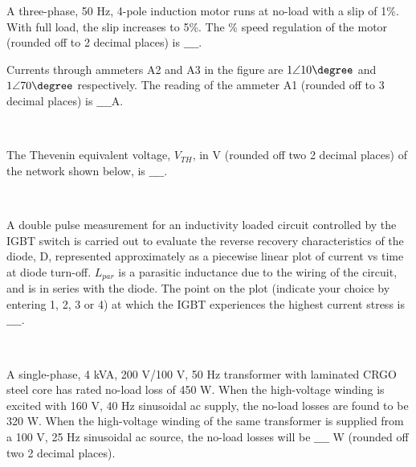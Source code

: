 \iffalse
\chapter{2020}
\author{AI24BTECH11009}
\section{ee}
\fi

\item A three-phase, 50 Hz, 4-pole induction motor runs at no-load with a slip of 1\%. With full load, the slip increases to 5\%. The \% speed regulation of the motor (rounded off to 2 decimal places) is $\_\_\_\_$. \\
\item Currents through ammeters A2 and A3 in the figure are $1\angle{10\degree}$ and $1\angle{70\degree}$ respectively. The reading of
the ammeter A1 (rounded off to 3 decimal places) is $\_\_\_\_$A.
\begin{figure}[!ht]
\centering
\resizebox{0.5\textwidth}{!}{%

}%
\end{figure}\\
\item The Thevenin equivalent voltage, $V_{TH}$, in V (rounded off two 2 decimal places) of the network shown below, is $\_\_\_\_$.
\begin{figure}[!ht]
\centering
\resizebox{0.5\textwidth}{!}{%

}%
\end{figure}\\
\item A double pulse measurement for an inductivity loaded circuit controlled by the IGBT switch is carried out to evaluate the reverse recovery characteristics of the diode, D, represented approximately as a piecewise linear plot of current vs time at diode turn-off. $L_{par}$ is a parasitic inductance due to the wiring of the circuit, and is in series with the diode. The point on the plot (indicate your choice by entering 1, 2, 3 or 4) at which the IGBT experiences the highest current stress is $\_\_\_\_$.
\begin{figure}[!ht]
\centering
\resizebox{0.7\textwidth}{!}{%

}%
\end{figure}\\
\item A single-phase, 4 kVA, 200 V/100 V, 50 Hz transformer with laminated CRGO steel core has rated no-load loss of 450 W. When the high-voltage winding is excited with 160 V, 40 Hz sinusoidal ac supply, the no-load losses are found to be 320 W. When the high-voltage winding of the same transformer is supplied from a 100 V, 25 Hz sinusoidal ac source, the no-load losses will be $\_\_\_\_$ W (rounded off two 2 decimal places). \\

